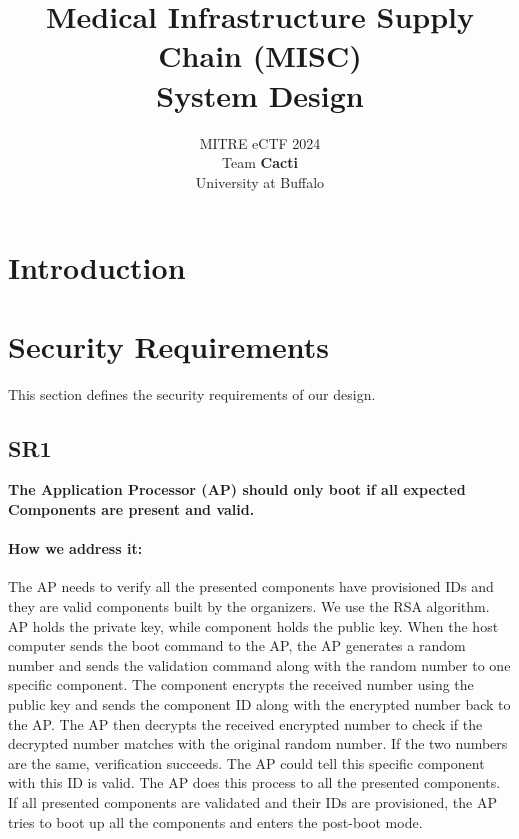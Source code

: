 \documentclass[11pt,oneside,onecolumn,letterpaper]{article}
\title{Medical Infrastructure Supply Chain (MISC) \\ System Design}
\author{MITRE eCTF 2024\\Team \textbf{Cacti}\\ University at Buffalo}
\date{}
\newcounter{alg}
\begin{document}
\normalsize


\maketitle

\renewcommand{\thepage}{System Design, Team Cacti, University at Buffalo--\arabic{page}}
\setcounter{page}{1} \normalsize
%

\newcommand{\flagRollback}{\textsf{Rollback}\xspace}

\section{Introduction}



\section{Security Requirements}

This section defines the security requirements of our design.

\subsection{SR1}
\textbf{The Application Processor (AP) should only boot if all expected Components are present and valid.}
\paragraph{How we address it:}
The AP needs to verify all the presented components have provisioned IDs and they are valid components built by the organizers.
We use the RSA algorithm.
AP holds the private key,
while component holds the public key.
When the host computer sends the boot command to the AP,
the AP generates a random number and sends the validation command along with the random number to one specific component.
The component encrypts the received number using the public key and sends the component ID along with the encrypted number back to the AP.
The AP then decrypts the received encrypted number to check if the decrypted number matches with the original random number.
If the two numbers are the same,
verification succeeds.
The AP could tell this specific component with this ID is valid.
The AP does this process to all the presented components.
If all presented components are validated and their IDs are provisioned,
the AP tries to boot up all the components and enters the post-boot mode.
\end{document}

